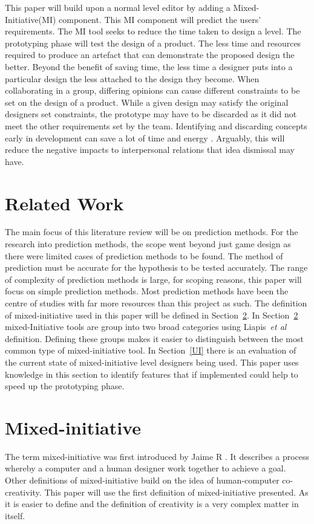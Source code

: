 \documentclass[journal]{IEEEtran}
\begin{document}
This paper will build upon a normal level editor by adding a Mixed-Initiative(MI) component. This MI component will predict the users' requirements. The MI tool seeks to reduce the time taken to design a level. The prototyping phase will test the design of a product. The less time and resources required to produce an artefact that can demonstrate the proposed design the better. Beyond the benefit of saving time, the less time a designer puts into a particular design the less attached to the design they become. When collaborating in a group, differing opinions can cause different constraints to be set on the design of a product. While a given design may satisfy the original designers set constraints, the prototype may have to be discarded as it did not meet the other requirements set by the team. Identifying and discarding concepts early in development can save a lot of time and energy \cite[p.489]{stempfle1999thinking}. Arguably, this will reduce the negative impacts to interpersonal relations that idea dismissal may have. 

\section{Related Work}
The main focus of this literature review will be on prediction methods. For the research into prediction methods, the scope went beyond just game design as there were limited cases of prediction methods to be found. The method of prediction must be accurate for the hypothesis to be tested accurately.  The range of complexity of prediction methods is large, for scoping reasons, this paper will focus on simple prediction methods. Most prediction methods have been the centre of studies with far more resources than this project as such.  The definition of mixed-initiative used in this paper will be defined in  Section~\ref{MI}.  In Section~\ref{MI} mixed-Initiative tools are group into two broad categories using Liapis~\textit{et al}\cite{liapis2016mixed} definition. Defining these groups makes it easier to distinguish between the most common type of mixed-initiative tool.  In Section~\ref{UI} there is an evaluation of the current state of mixed-initiative level designers being used.  This paper uses knowledge in this section to identify features that if implemented could help to speed up the prototyping phase. 

\section{Mixed-initiative} \label{MI}
The term mixed-initiative was first introduced by Jaime R \cite{carbonell1970mixed}.
It describes a process whereby a computer and a human designer work together to achieve a goal. Other definitions of mixed-initiative build on the idea of human-computer co-creativity. This paper will use the first definition of mixed-initiative presented. As it is easier to define and the definition of creativity is a very complex matter in itself. 
\end{document}
